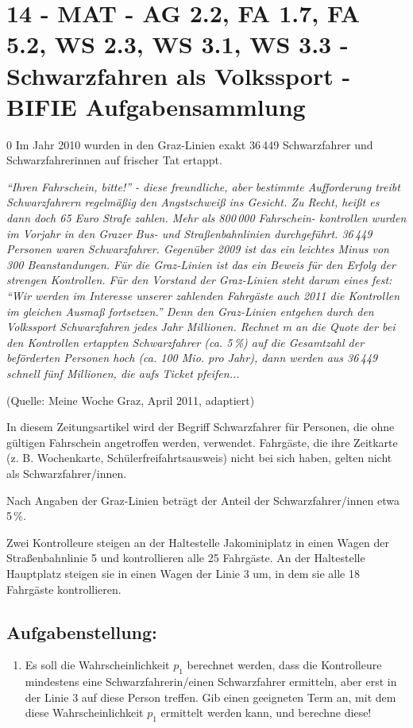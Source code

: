 \section{14 - MAT - AG 2.2, FA 1.7, FA 5.2, WS 2.3, WS 3.1, WS 3.3 - Schwarzfahren als Volkssport - BIFIE Aufgabensammlung}

\begin{langesbeispiel} \item[0] %
				Im Jahr 2010 wurden in den Graz-Linien exakt 36\,449 Schwarzfahrer und Schwarzfahrerinnen auf frischer Tat ertappt.  
				
\textit{"`Ihren Fahrschein, bitte!"' - diese freundliche, aber bestimmte Aufforderung treibt Schwarzfahrern regelmäßig den Angstschweiß ins Gesicht. Zu Recht, heißt es dann doch 65 Euro Strafe zahlen. Mehr als 800\,000 Fahrschein-
kontrollen wurden im Vorjahr in den Grazer Bus- und Straßenbahnlinien durchgeführt. 36\,449 Personen waren Schwarzfahrer. Gegenüber 2009 ist das ein leichtes Minus von 300 Beanstandungen. Für die Graz-Linien ist das ein Beweis für den Erfolg der strengen Kontrollen. Für den Vorstand der Graz-Linien steht darum eines fest: "`Wir werden im Interesse unserer zahlenden Fahrgäste 
auch 2011 die Kontrollen im gleichen Ausmaß fortsetzen."' Denn den Graz-Linien entgehen durch den Volkssport Schwarzfahren jedes Jahr Millionen. Rechnet m
an die Quote der bei den Kontrollen ertappten Schwarzfahrer (ca. 5\,\%) 
auf die Gesamtzahl der beförderten Personen hoch (ca. 100 Mio. pro Jahr), dann werden aus 36\,449 schnell fünf Millionen, die aufs Ticket pfeifen...} 

\begin{footnotesize}(Quelle: Meine Woche Graz, April 2011, adaptiert)\end{footnotesize}

In diesem Zeitungsartikel wird der Begriff Schwarzfahrer für Personen, die ohne gültigen Fahrschein angetroffen werden, verwendet. Fahrgäste, die ihre Zeitkarte (z. B. Wochenkarte, Schülerfreifahrtsausweis) nicht bei sich haben,
 gelten nicht als Schwarzfahrer/innen. 

Nach Angaben der Graz-Linien beträgt der Anteil der Schwarzfahrer/innen etwa 5\,\%. 

Zwei Kontrolleure steigen an der Haltestelle Jakominiplatz in einen Wagen der Straßenbahnlinie 5 und kontrollieren alle 25 Fahrgäste. An der Haltestelle 
Hauptplatz steigen sie in einen Wagen der Linie 3 um, in dem sie alle 18 Fahrgäste kontrollieren.
				
\subsection{Aufgabenstellung:}
\begin{enumerate}
	\item Es soll die Wahrscheinlichkeit $p_1$ berechnet werden, dass die Kontrolleure mindestens eine Schwarzfahrerin/einen Schwarzfahrer ermitteln, aber erst in der Linie 3 auf diese Person treffen. Gib einen geeigneten Term an, mit dem diese Wahrscheinlichkeit $p_1$ ermittelt werden kann, und berechne diese! 
	

\end{enumerate}
\end{langesbeispiel}
